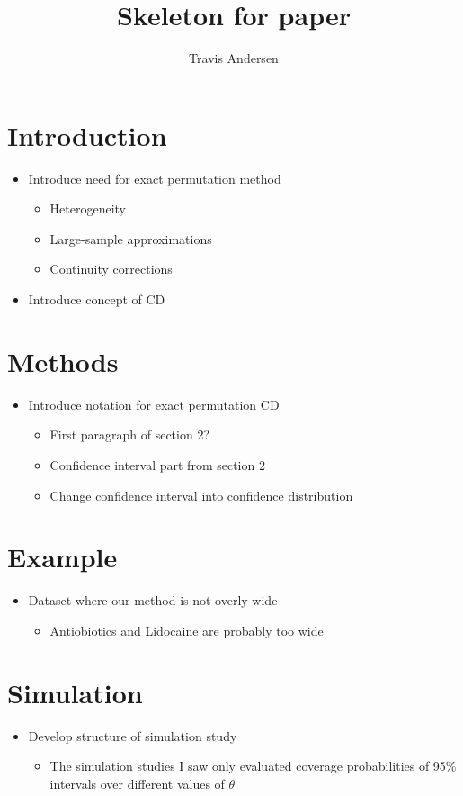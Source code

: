 \documentclass{article}
\title{Skeleton for paper}
\author{Travis Andersen}
\begin{document}
\maketitle  

\section{Introduction}
\begin{itemize}
  \item Introduce need for exact permutation method
  \begin{itemize}
    \item Heterogeneity
    \item Large-sample approximations
    \item Continuity corrections
  \end{itemize}  
  \item Introduce concept of CD
\end{itemize}

\section{Methods}
\begin{itemize}
  \item Introduce notation for exact permutation CD
  \begin{itemize}
    \item First paragraph of section 2?
    \item Confidence interval part from section 2
    \item Change confidence interval into confidence distribution
  \end{itemize}
\end{itemize}

\section{Example}
\begin{itemize}
  \item Dataset where our method is not overly wide
  \begin{itemize}
    \item Antiobiotics and Lidocaine are probably too wide
  \end{itemize}
\end{itemize}

\section{Simulation}
\begin{itemize}
  \item Develop structure of simulation study
  \begin{itemize}
    \item The simulation studies I saw only evaluated coverage probabilities of 95\% intervals over different values of $\theta$
  \end{itemize}
\end{itemize}
\end{document}
